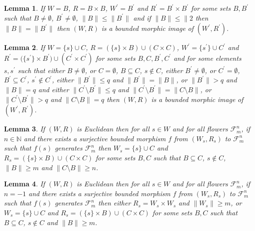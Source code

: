 \documentclass[draft]{article}
\newtheorem{lemma}{Lemma}
\def\N{\mathbb{N}}
\begin{document}
%
%
\begin{lemma}\label{lemma:inclusion:Bprime:B:for:generated:subframes:is:bmi:quater}
%
%
If $W{=}B$, $R{=}B{\times}B$, $W^{\prime}{=}B^{\prime}$ and $R^{\prime}{=}B^{\prime}{\times}B^{\prime}$ for some sets $B,B^{\prime}$ such that $B{\not=}\emptyset$, $B^{\prime}{\not=}\emptyset$, ${\parallel}B{\parallel}{\leq}{\parallel}B^{\prime}{\parallel}$ and if ${\parallel}B{\parallel}{\leq}{\parallel}2$ then ${\parallel}B{\parallel}{=}{\parallel}B^{\prime}{\parallel}$ then $(W,R)$ is a bounded morphic image of $(W^{\prime},R^{\prime})$.
%
%
\end{lemma}
%
%
\begin{lemma}\label{lemma:about:frames:C:B:smaller:greater}
%
%
If $W{=}\{s\}{\cup}C$, $R{=}(\{s\}{\times}B){\cup}(C{\times}C)$, $W^{\prime}{=}\{s^{\prime}\}{\cup}C^{\prime}$ and $R^{\prime}{=}(\{s^{\prime}\}{\times}
%
%
%
%
%
%
%
%
%
%
%
%
$\linebreak$
%
%
%
%
%
%
%
%
%
%
%
%
B^{\prime}){\cup}(C^{\prime}{\times}C^{\prime})$ for some sets $B,C,B^{\prime},C^{\prime}$ and for some elements $s,s^{\prime}$ such that either $B{\not=}\emptyset$, or $C{=}\emptyset$, $B{\subseteq}C$, $s{\not\in}C$, either $B^{\prime}{\not=}\emptyset$, or $C^{\prime}{=}\emptyset$, $B^{\prime}{\subseteq}C^{\prime}$, $s^{\prime}{\not\in}C^{\prime}$, either ${\parallel}B^{\prime}{\parallel}{\leq}q$ and ${\parallel}B^{\prime}{\parallel}{=}{\parallel}B{\parallel}$, or ${\parallel}B^{\prime}{\parallel}{>}q$ and ${\parallel}B{\parallel}{=}q$ and either ${\parallel}C^{\prime}{\setminus}B^{\prime}{\parallel}{\leq}q$ and ${\parallel}C^{\prime}{\setminus}B^{\prime}{\parallel}{=}{\parallel}C{\setminus}B{\parallel}$, or ${\parallel}C^{\prime}{\setminus}B^{\prime}{\parallel}{>}q$ and ${\parallel}C{\setminus}B{\parallel}{=}q$ then $(W,R)$ is a bounded morphic image of $(W^{\prime},R^{\prime})$.
%
%
\end{lemma}
%
%
\begin{lemma}\label{lemma:about:what:happens:when:it:exists:bmi:flower:integer}
%
%
If $(W,R)$ is Euclidean then for all $s{\in}W$ and for all flowers ${\mathcal F}_{m}^{n}$, if $n{\in}\N$ and there exists a surjective bounded morphism $f$ from $(W_{s},R_{s})$ to ${\mathcal F}_{m}^{n}$ such that $f(s)$ generates ${\mathcal F}_{m}^{n}$ then $W_{s}{=}\{s\}{\cup}C$ and $R_{s}{=}(\{s\}{\times}B){\cup}(C{\times}C)$ for some sets $B,C$ such that $B{\subseteq}C$, $s{\not\in}C$, ${\parallel}B{\parallel}{\geq}m$ and ${\parallel}C{\setminus}B{\parallel}{\geq}n$.
%
%
\end{lemma}
%
%
\begin{lemma}\label{lemma:about:what:happens:when:it:exists:bmi:flower:minus:one}
%
%
If $(W,R)$ is Euclidean then for all $s{\in}W$ and for all flowers ${\mathcal F}_{m}^{n}$, if $n{=}{-}1$ and there exists a surjective bounded morphism $f$ from $(W_{s},R_{s})$ to ${\mathcal F}_{m}^{n}$ such that $f(s)$ generates ${\mathcal F}_{m}^{n}$ then either $R_{s}{=}W_{s}{\times}W_{s}$ and ${\parallel}W_{s}{\parallel}{\geq}m$, or $W_{s}{=}\{s\}{\cup}C$ and $R_{s}{=}(\{s\}{\times}B){\cup}(C{\times}C)$ for some sets $B,C$ such that $B{\subseteq}C$, $s{\not\in}C$ and ${\parallel}B{\parallel}{\geq}m$.
%
%
\end{lemma}
%
%
%
%
\end{document}
